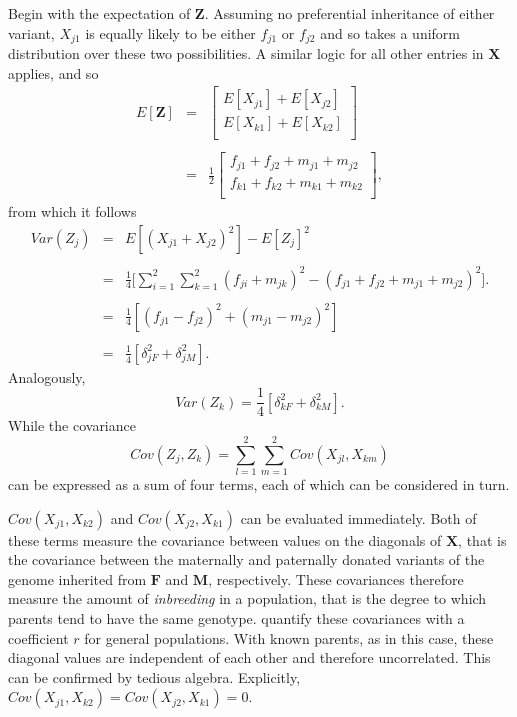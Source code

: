 \documentclass[12pt]{article}
\newcommand{\ve}[1]{\mathbf{#1}}           %
\newcommand{\m}[1]{\mathbf{#1}}               %
\begin{document}
Begin with the expectation of $\ve{Z}$. Assuming no preferential inheritance of either variant, $X_{j1}$ is equally likely to be either $f_{j1}$ or $f_{j2}$ and so takes a uniform distribution over these two possibilities. A similar logic for all other entries in $\m{X}$ applies, and so
\begin{eqnarray}
    E[\ve{Z}] & = & {\begin{bmatrix}
        E[X_{j1}] + E[X_{j2}] \\
        E[X_{k1}] + E[X_{k2}] \\
      \end{bmatrix}} \nonumber\\
    & & \nonumber\\
    & = & {\frac{1}{2}\begin{bmatrix}
        f_{j1} + f_{j2} + m_{j1} + m_{j2} \\
        f_{k1} + f_{k2} + m_{k1} + m_{k2} \\
      \end{bmatrix}}, \nonumber
\end{eqnarray}
from which it follows
\begin{eqnarray}
    Var(Z_j) & = & E[(X_{j1} + X_{j2})^2] - E[Z_j]^2 \nonumber\\
    & & \nonumber\\ 
    & = & \frac{1}{4} \Big[ \sum_{i = 1}^2 \sum_{k = 1}^2 (f_{ji} + m_{jk})^2 - (f_{j1} + f_{j2} + m_{j1} + m_{j2})^2 \Big]. \nonumber \\
    & & \nonumber \\
    & = & \frac{1}{4} \left [ (f_{j1} - f_{j2})^2 + (m_{j1} - m_{j2})^2 \right ] \nonumber \\
    & & \nonumber \\
    & = & \frac{1}{4} \left [ \delta_{jF}^2 + \delta_{jM}^2 \right ]. \label{eq:z1var}
\end{eqnarray}
Analogously,
\begin{equation} \label{eq:z2var}
  Var(Z_k) = \frac{1}{4} \left [ \delta_{kF}^2 + \delta_{kM}^2 \right ].
\end{equation}
While the covariance
\begin{equation} 
    Cov(Z_j, Z_k) =  \sum_{l = 1}^2 \sum_{m = 1}^2 Cov(X_{jl}, X_{km}) \label{eq:covstep1}
\end{equation}
can be expressed as a sum of four terms, each of which can be considered in turn.

$Cov(X_{j1}, X_{k2})$ and $Cov(X_{j2}, X_{k1})$ can be evaluated immediately. Both of these terms measure the covariance between values on the diagonals of $\m{X}$, that is the covariance between the maternally and paternally donated variants of the genome inherited from $\m{F}$ and $\m{M}$, respectively. These covariances therefore measure the amount of \emph{inbreeding} in a population, that is the degree to which parents tend to have the same genotype. \cite{crowkimura1970intro} quantify these covariances with a coefficient $r$ for general populations. With known parents, as in this case, these diagonal values are independent of each other and therefore uncorrelated. This can be confirmed by tedious algebra. Explicitly, $Cov(X_{j1}, X_{k2}) = Cov(X_{j2}, X_{k1}) = 0$. 
\end{document}
